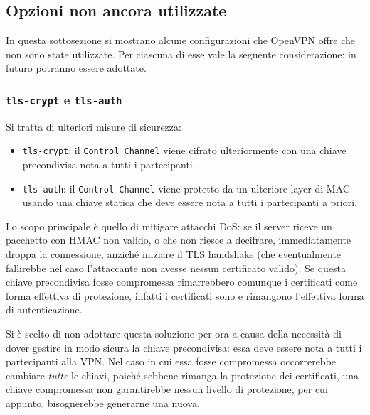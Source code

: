\subsection{Opzioni non ancora utilizzate}
In questa sottosezione si mostrano alcune configurazioni che OpenVPN offre che
non sono state utilizzate. Per ciascuna di esse vale la seguente considerazione:
in futuro potranno essere adottate.

\subsubsection{\texttt{tls-crypt} e \texttt{tls-auth}} Si tratta di ulteriori
misure di sicurezza:
\begin{itemize}
  \item \texttt{tls-crypt}: il \texttt{Control Channel} viene cifrato ulteriormente
  con una chiave precondivisa nota a tutti i partecipanti.
  \item \texttt{tls-auth}: il \texttt{Control Channel} viene protetto da un ulteriore
  layer di MAC usando una chiave statica che deve essere nota a tutti i partecipanti a priori.
\end{itemize}
Lo scopo principale è quello di mitigare attacchi DoS: se il server riceve un pacchetto con HMAC non valido,
  o che non riesce a decifrare, immediatamente droppa la connessione, anziché iniziare
  il TLS handshake (che eventualmente fallirebbe nel caso l'attaccante non avesse
  nessun certificato valido).
Se questa chiave precondivisa fosse compromessa rimarrebbero comunque i certificati
come forma effettiva di protezione, infatti i certificati sono e rimangono
l'effettiva forma di autenticazione.

Si è scelto di non adottare questa soluzione per ora a causa della necessità di dover gestire
in modo sicura la chiave precondivisa: essa deve essere nota a tutti i partecipanti
alla VPN. Nel caso in cui essa fosse compromessa occorrerebbe cambiare \textit{tutte}
le chiavi, poiché sebbene rimanga la protezione dei certificati, una chiave
compromessa non garantirebbe nessun livello di protezione, per cui appunto, bisognerebbe
generarne una nuova.

